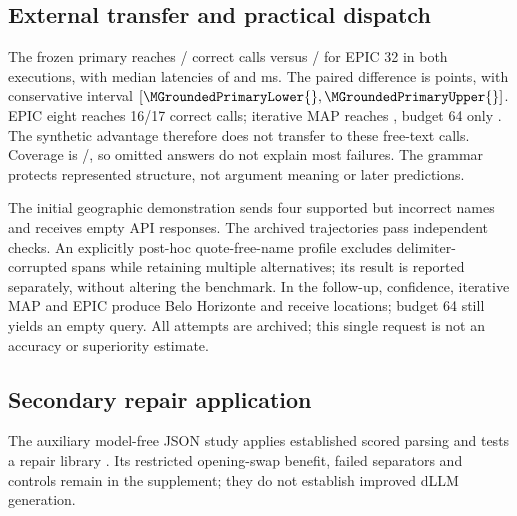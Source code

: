 \subsection{External transfer and practical dispatch}



The frozen primary reaches \MGroundedConfidenceCorrect{}/\MGroundedCases{} correct calls versus \MGroundedEpicThirtyTwoCorrect{}/\MGroundedCases{} for EPIC 32 in both executions, with median latencies of \MGroundedConfidenceMs{} and \MGroundedEpicThirtyTwoMs{} ms. The paired difference is \MGroundedPrimaryDifference{} points, with conservative interval $[\MGroundedPrimaryLower{},\MGroundedPrimaryUpper{}]$. EPIC eight reaches 16/17 correct calls; iterative MAP reaches \MGroundedMapEightCorrect{}, budget 64 only \MGroundedBudgetFullCorrect{}. The synthetic advantage therefore does not transfer to these free-text calls. Coverage is \MGroundedCovered{}/\MGroundedCases{}, so omitted answers do not explain most failures. The grammar protects represented structure, not argument meaning or later predictions.

The initial geographic demonstration sends four supported but incorrect names and receives \MQueryInitialEmpty{} empty API responses. The archived trajectories pass independent checks. An explicitly post-hoc quote-free-name profile excludes delimiter-corrupted spans while retaining multiple alternatives; its result is reported separately, without altering the benchmark. In the follow-up, confidence, iterative MAP and EPIC produce Belo Horizonte and receive locations; budget 64 still yields an empty query. All \MQueryRecords{} attempts are archived; this single request is not an accuracy or superiority estimate.


\subsection{Secondary repair application}

The auxiliary model-free JSON study applies established scored parsing \cite{kociumaka2024edit} and tests a repair library \cite{baccianella2025jsonrepair}. Its restricted opening-swap benefit, failed separators and controls remain in the supplement; they do not establish improved dLLM generation.
